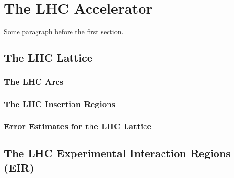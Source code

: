 
\chapter{The LHC Accelerator} %

\label{Chapter2} %


Some paragraph before the first section.




\section{The LHC Lattice}


\subsection{The LHC Arcs}

\subsection{The LHC Insertion Regions}

\subsection{Error Estimates for the LHC Lattice}


\section{The LHC Experimental Interaction Regions (EIR)}

